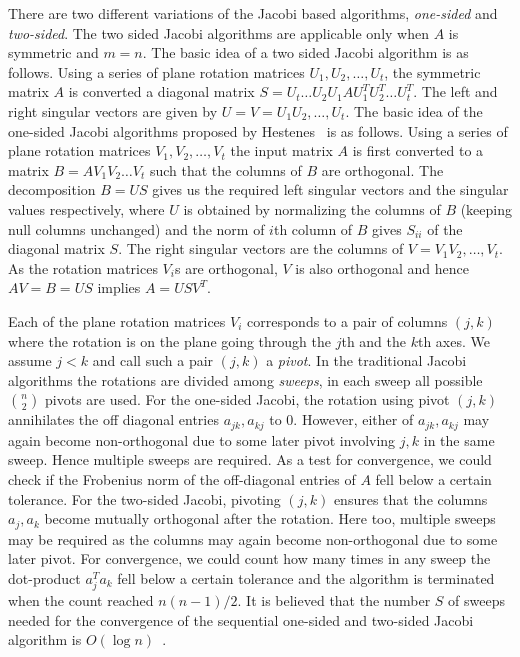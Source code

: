 \documentclass[10pt, conference, compsocconf]{IEEEtran}
\begin{document}
There are two different variations of the Jacobi based algorithms, \emph{one-sided} and \emph{two-sided}. The two sided Jacobi algorithms are applicable only when $A$ is symmetric and $m=n$. The basic idea of a two sided Jacobi algorithm is as follows. Using a series of plane rotation matrices $U_1, U_2, \ldots, U_t$, the symmetric matrix $A$ is converted a diagonal matrix $S = U_t \ldots U_2 U_1 A U^T_1 U^T_2 \ldots U^T_t$. The left and right singular vectors are given by $U=V=U_1U_2,\ldots,U_t$. The basic idea of the one-sided Jacobi algorithms proposed by Hestenes~\cite{hestenes1958inversion} is as follows. Using a series of plane rotation matrices $V_1, V_2, \ldots, V_t$ the input matrix $A$ is first converted to a matrix $B=AV_1V_2\ldots V_t$ such that the columns of $B$ are orthogonal. The decomposition $B = US$ gives us the required left singular vectors and the singular values respectively, where $U$ is obtained by normalizing the columns of $B$ (keeping null columns unchanged) and the norm of $i$th column of $B$ gives $S_{ii}$ of the diagonal matrix $S$. The right singular vectors are the columns of $V=V_1V_2,\ldots,V_t$. As the rotation matrices $V_i$s are orthogonal, $V$ is also orthogonal and hence $AV = B = US$ implies $A = USV^T$.

Each of the plane rotation matrices $V_i$ corresponds to a pair of columns $(j,k)$ where the rotation is on the plane going through the $j$th and the $k$th axes. We assume $j<k$ and call such a pair $(j,k)$ a \emph{pivot}.  In the traditional Jacobi algorithms the rotations are divided among \emph{sweeps}, in each sweep all possible ${n \choose 2}$ pivots are used. For the one-sided Jacobi, the rotation using pivot $(j,k)$ annihilates the off diagonal entries $a_{jk}, a_{kj}$ to $0$. However, either of $a_{jk}, a_{kj}$ may again become non-orthogonal due to some later pivot involving $j,k$ in the same sweep. Hence multiple sweeps are required. As a test for convergence, we could check if the Frobenius norm of the off-diagonal entries of $A$ fell below a certain tolerance. For the two-sided Jacobi, pivoting $(j,k)$ ensures that the columns $a_j,a_k$ become mutually orthogonal after the rotation. Here too, multiple sweeps may be required as the columns may again become non-orthogonal due to some later pivot. For convergence, we could count how many times in any sweep the dot-product $a_j^{T}a_k$ fell below a certain tolerance and the algorithm is terminated when the count reached $n(n-1)/2$. It is believed that the number $S$ of sweeps needed for the convergence of the sequential one-sided and two-sided Jacobi algorithm is $O(\log n)$~\cite{golub2012matrix}.  
\end{document}
